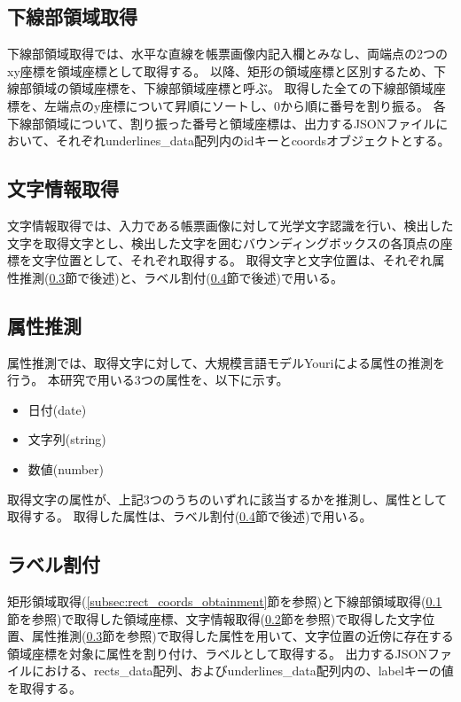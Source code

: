 \subsection{下線部領域取得}\label{subsec:underline_coords_obtainment}
下線部領域取得では、水平な直線を帳票画像内記入欄とみなし、両端点の2つのxy座標を領域座標として取得する。
以降、矩形の領域座標と区別するため、下線部領域の領域座標を、下線部領域座標と呼ぶ。
取得した全ての下線部領域座標を、左端点のy座標について昇順にソートし、0から順に番号を割り振る。
各下線部領域について、割り振った番号と領域座標は、出力するJSONファイルにおいて、それぞれunderlines\_data配列内のidキーとcoordsオブジェクトとする。

\subsection{文字情報取得}\label{subsec:char_information_obtainment}
文字情報取得では、入力である帳票画像に対して光学文字認識を行い、検出した文字を取得文字とし、検出した文字を囲むバウンディングボックスの各頂点の座標を文字位置として、それぞれ取得する。
取得文字と文字位置は、それぞれ属性推測(\ref{subsec:att_prediction}節で後述)と、ラベル割付(\ref{subsec:label_link}節で後述)で用いる。

\subsection{属性推測}\label{subsec:att_prediction}
属性推測では、取得文字に対して、大規模言語モデルYouriによる属性の推測を行う。
本研究で用いる3つの属性を、以下に示す。

\begin{itemize}
    \item 日付(date)
    \item 文字列(string)
    \item 数値(number)
\end{itemize}

取得文字の属性が、上記3つのうちのいずれに該当するかを推測し、属性として取得する。
取得した属性は、ラベル割付(\ref{subsec:label_link}節で後述)で用いる。

\subsection{ラベル割付}\label{subsec:label_link}
矩形領域取得(\ref{subsec:rect_coords_obtainment}節を参照)と下線部領域取得(\ref{subsec:underline_coords_obtainment}節を参照)で取得した領域座標、文字情報取得(\ref{subsec:char_information_obtainment}節を参照)で取得した文字位置、属性推測(\ref{subsec:att_prediction}節を参照)で取得した属性を用いて、文字位置の近傍に存在する領域座標を対象に属性を割り付け、ラベルとして取得する。
出力するJSONファイルにおける、rects\_data配列、およびunderlines\_data配列内の、labelキーの値を取得する。

